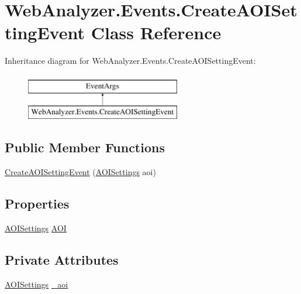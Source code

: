 \hypertarget{class_web_analyzer_1_1_events_1_1_create_a_o_i_setting_event}{}\section{Web\+Analyzer.\+Events.\+Create\+A\+O\+I\+Setting\+Event Class Reference}
\label{class_web_analyzer_1_1_events_1_1_create_a_o_i_setting_event}
Inheritance diagram for Web\+Analyzer.\+Events.\+Create\+A\+O\+I\+Setting\+Event\+:\begin{figure}[H]
\begin{center}
\leavevmode
\includegraphics[height=2.000000cm]{class_web_analyzer_1_1_events_1_1_create_a_o_i_setting_event}
\end{center}
\end{figure}
\subsection*{Public Member Functions}
\begin{DoxyCompactItemize}
\item 
\hyperlink{class_web_analyzer_1_1_events_1_1_create_a_o_i_setting_event_aa3c28ac19d3ad160e5b216de3763bfd3}{Create\+A\+O\+I\+Setting\+Event} (\hyperlink{class_web_analyzer_1_1_models_1_1_settings_model_1_1_a_o_i_settings}{A\+O\+I\+Settings} aoi)
\end{DoxyCompactItemize}
\subsection*{Properties}
\begin{DoxyCompactItemize}
\item 
\hyperlink{class_web_analyzer_1_1_models_1_1_settings_model_1_1_a_o_i_settings}{A\+O\+I\+Settings} \hyperlink{class_web_analyzer_1_1_events_1_1_create_a_o_i_setting_event_a9fd4a39178dd304567bc8439d90a4b32}{A\+O\+I}
\end{DoxyCompactItemize}
\subsection*{Private Attributes}
\begin{DoxyCompactItemize}
\item 
\hyperlink{class_web_analyzer_1_1_models_1_1_settings_model_1_1_a_o_i_settings}{A\+O\+I\+Settings} \hyperlink{class_web_analyzer_1_1_events_1_1_create_a_o_i_setting_event_a4053962220f0a13a10049ea4cefeb61d}{\+\_\+aoi}
\end{DoxyCompactItemize}


